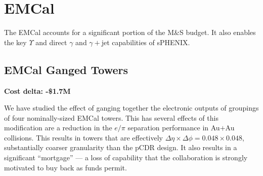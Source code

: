 \section{EMCal}

The EMCal accounts for a significant portion of the M\&S budget.  It
also enables the key $\Upsilon$ and direct $\gamma$ and $\gamma+$jet
capabilities of sPHENIX.  

\subsection{EMCal Ganged Towers}
\label{emcal_ganging}

\textbf{Cost delta: -\$1.7M}

We have studied the effect of ganging together the electronic outputs
of groupings of four nominally-sized EMCal towers.  This has several
effects of this modification are a reduction in the $e/\pi$ separation
performance in Au$+$Au collisions.  This results in towers that are
effectively $\Delta\eta\times\Delta\phi = 0.048\times0.048$,
substantially coarser granularity than the pCDR design.  It also
results in a significant ``mortgage'' --- a loss of capability that
the collaboration is strongly motivated to buy back as funds permit.


